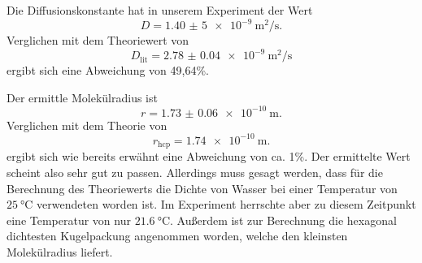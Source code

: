Die Diffusionskonstante hat in unserem Experiment der Wert 
\begin{equation*}
  D= \SI{1,40(5)e-9}{\meter^2\per\second}.
\end{equation*}
Verglichen mit dem Theoriewert\cite{diff} von 
\begin{equation*}
  D_\text{lit} = \SI{2.78(4)e-9}{\metre^2\per\second}
\end{equation*}
ergibt sich eine Abweichung von 49,64\%.

Der ermittle Molekülradius ist
\begin{equation*}
  r = \SI{1.73(6)e-10}{\meter}.
\end{equation*}
Verglichen mit dem Theorie von
\begin{equation*}
  r_\text{hcp}= \SI{1.74e-10}{\metre}.
\end{equation*}
ergibt sich wie bereits erwähnt eine Abweichung von ca. 1\%.
Der ermittelte Wert scheint also sehr gut zu passen. 
Allerdings muss gesagt werden, dass für die Berechnung des Theoriewerts die Dichte von Wasser bei einer 
Temperatur von $\SI{25}{\celsius}$ verwendeten worden ist.
Im Experiment herrschte aber zu diesem Zeitpunkt eine Temperatur von nur $\SI{21,6}{\celsius}$.
Außerdem ist zur Berechnung die hexagonal dichtesten Kugelpackung angenommen worden, 
welche den kleinsten Molekülradius liefert.
%
\newpage
\nocite{*}
\printbibliography{}
